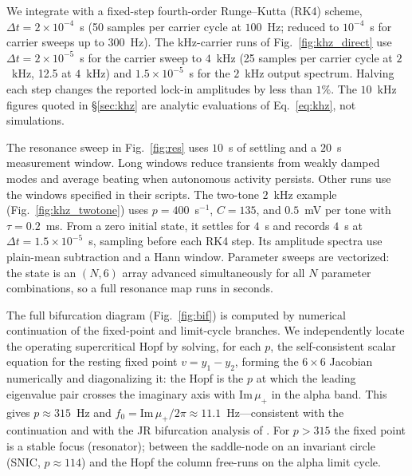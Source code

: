 \documentclass[11pt,a4paper]{article}
\begin{document}
We integrate with a fixed-step fourth-order Runge--Kutta (RK4) scheme,
$\Delta t=2\times10^{-4}$~s (50 samples per carrier cycle at $100$~Hz; reduced to
$10^{-4}$~s for carrier sweeps up to $300$~Hz). The kHz-carrier runs of
Fig.~\ref{fig:khz_direct} use $\Delta t=2\times10^{-5}$~s for the carrier sweep to
$4$~kHz (25 samples per carrier cycle at $2$~kHz, 12.5 at $4$~kHz) and
$1.5\times10^{-5}$~s for the $2$~kHz output spectrum. Halving each step changes the
reported lock-in amplitudes by less than $1\%$. The $10$~kHz figures quoted in
\S\ref{sec:khz} are analytic evaluations of Eq.~\eqref{eq:khz}, not simulations.

The resonance sweep in Fig.~\ref{fig:res} uses $10$~s of settling and a $20$~s
measurement window. Long windows reduce transients from weakly damped modes and
average beating when autonomous activity persists. Other runs use the windows
specified in their scripts.
The two-tone $2$~kHz example (Fig.~\ref{fig:khz_twotone}) uses $p=400$~s$^{-1}$,
$C=135$, and $0.5$~mV per tone with $\tau=0.2$~ms. From a zero initial state,
it settles for $4$~s and records $4$~s at $\Delta t=1.5\times10^{-5}$~s,
sampling before each RK4 step. Its amplitude spectra use plain-mean subtraction
and a Hann window. Parameter
sweeps are vectorized: the state is an
$(N,6)$ array advanced simultaneously for all $N$ parameter combinations, so a full
resonance map runs in seconds.

The full bifurcation diagram (Fig.~\ref{fig:bif}) is computed by numerical continuation of
the fixed-point and limit-cycle branches. We independently locate the operating
supercritical Hopf by solving, for each $p$, the self-consistent scalar equation for the
resting fixed point $v=y_1-y_2$, forming the $6\times6$ Jacobian numerically and
diagonalizing it: the Hopf is the $p$ at which the leading eigenvalue pair crosses the
imaginary axis with $\mathrm{Im}\,\mu_+$ in the alpha band. This gives $p\approx315$~Hz
and $f_0=\mathrm{Im}\,\mu_+/2\pi\approx11.1$~Hz---consistent with the continuation and
with the JR bifurcation analysis of \cite{grimbert2006}. For $p>315$ the fixed point is a
stable focus (resonator); between the saddle-node on an invariant circle (SNIC,
$p\!\approx\!114$) and the Hopf the column free-runs on the alpha limit cycle.
\end{document}
